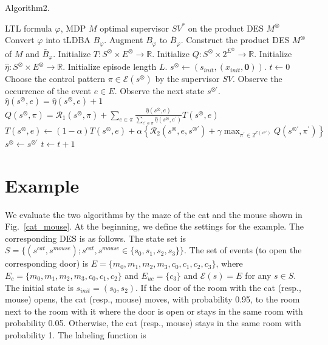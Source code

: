 \documentclass[letterpaper, 10 pt, conference]{ieeeconf}
\newcommand{\myspdq}{\ensuremath{[\![s^{\otimes \prime}]\!]}_q}
\begin{document}
 \begin{algorithm}
  \caption{Algorithm2.}
  \begin{algorithmic}[1]
  \renewcommand{\algorithmicrequire}{\textbf{Input:}}
  \renewcommand{\algorithmicensure}{\textbf{Output:}}
  \REQUIRE LTL formula $\varphi$, MDP $M$
  \ENSURE  optimal supervisor $SV^{\ast}$ on the product DES $M^{\otimes}$
   \STATE Convert $\varphi$ into tLDBA $B_{\varphi}$.
   \STATE Augment $B_{\varphi}$ to $\bar{B}_{\varphi}$.
   \STATE Construct the product DES $M^{\otimes}$ of $M$ and $\bar{B}_{\varphi}$.
   \STATE Initialize $T:S^{\otimes} \times E^{\otimes} \rightarrow \mathbb{R}$.
   \STATE Initialize $Q:S^{\otimes} \times 2^{E^{\otimes}} \rightarrow \mathbb{R}$.
   \STATE Initialize $\hat{\eta}:S^{\otimes} \times E^{\otimes} \rightarrow \mathbb{R}$.
   \STATE Initialize episode length $L$.
   \STATE $s^{\otimes} \leftarrow (s_{init},(x_{init},\bm{0}))$.
   \STATE $t \leftarrow 0$
   \WHILE {$t <L$ and $\myspdq \notin SinkSet$}
   \STATE Choose the control pattern $\pi \in \mathcal{E}(s^{\otimes})$ by the supervisor $SV$.
   \STATE Observe the occurrence of the event $e \in E$.
   \STATE Observe the next state $s^{\otimes \prime}$.
   \STATE $\hat{\eta}(s^{\otimes},e) = \hat{\eta}(s^{\otimes},e) + 1$
   \STATE  $Q(s^{\otimes},\pi) = \mathcal{R}_1(s^{\otimes},\pi) + \sum_{e \in \pi} \frac{\hat{\eta}(s^{\otimes},e)}{\sum_{e^{\prime} \in \pi} \hat{\eta}(s^{\otimes},e^{\prime})} T(s^{\otimes},e)$
   \STATE $T(s^{\otimes},e) \leftarrow (1-\alpha)T(s^{\otimes},e) + \alpha \left \{ \mathcal{R}_2(s^{\otimes},e,s^{\otimes \prime}) + \gamma \max_{\pi^{\prime} \in 2^{\mathcal{E}(s^{\otimes \prime})}}Q(s^{\otimes \prime},\pi^{\prime}) \right \}$
   \STATE $s^{\otimes} \leftarrow s^{\otimes \prime}$
   \STATE $t \leftarrow t + 1$
   \ENDWHILE
   \ENDWHILE
  \end{algorithmic}
  \label{alg2}
  \end{algorithm}

\section{Example}
We evaluate the two algorithms by the maze of the cat and the mouse shown in Fig.\ \ref{cat_mouse}. At the beginning, we define the settings for the example. The corresponding DES is as follows. The state set is $S = \{ (s^{cat}, s^{mouse}) ; s^{cat},s^{mouse} \in \{ s_0,s_1,s_2,s_3 \} \}$. The set of events (to open the corresponding door) is $E = \{ m_0, m_1, m_2, m_3, c_0, c_1, c_2, c_3 \}$, where $E_{c} = \{ m_0, m_1, m_2, m_3, c_0, c_1, c_2 \}$ and $E_{uc} = \{ c_3 \}$ and $\mathcal{E}(s) = E$ for any $s \in S$. The initial state is $s_{init} = (s_0, s_2)$. If the door of the room with the cat (resp., mouse) opens, the cat (resp., mouse) moves, with probability 0.95, to the room next to the room with it where the door is open or stays in the same room with probability 0.05. Otherwise, the cat (resp., mouse) stays in the same room with probability 1. The labeling function is
\end{document}
